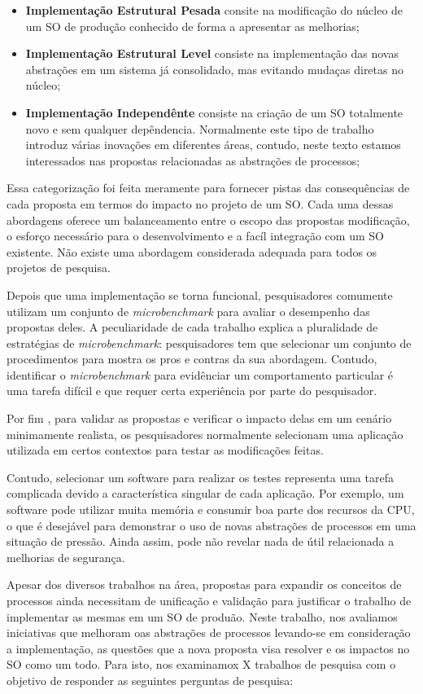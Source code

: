 \begin{itemize}
\item \textbf{Implementação Estrutural Pesada} consite na modificação do núcleo
  de um SO de produção conhecido de forma a apresentar as melhorias;
\item \textbf{Implementação Estrutural Level} consiste na implementação das
  novas abstrações em um sistema já consolidado, mas evitando mudaças diretas
  no núcleo;
\item \textbf{Implementação Independênte} consiste na criação de um SO
  totalmente novo e sem qualquer depêndencia. Normalmente este tipo de trabalho
  introduz várias inovações em diferentes áreas, contudo, neste texto estamos
  interessados nas propostas relacionadas as abstrações de processos;
\end{itemize}
Essa categorização foi feita meramente para fornecer pistas das consequências
de cada proposta em termos do impacto no projeto de um SO. Cada uma dessas
abordagens oferece um balanceamento entre o escopo das propostas modificação, o
esforço necessário para o desenvolvimento e a facíl integração com um SO
existente. Não existe uma abordagem considerada adequada para todos os projetos
de pesquisa.

Depois que uma implementação se torna funcional, pesquisadores comumente
utilizam um conjunto de \emph{microbenchmark} para avaliar o desempenho das
propostas deles. A peculiaridade de cada trabalho explica a pluralidade de
estratégias de \emph{microbenchmark}: pesquisadores tem que selecionar um
conjunto de procedimentos para mostra os pros e contras da sua abordagem.
Contudo, identificar o \emph{microbenchmark} para evidênciar um comportamento
particular é uma tarefa difícil e que requer certa experiência por parte do
pesquisador.

Por fim , para validar as propostas e verificar o impacto delas em um cenário
minimamente realista, os pesquisadores normalmente selecionam uma aplicação
utilizada em certos contextos para testar as modificações feitas.

Contudo, selecionar um software para realizar os testes representa uma tarefa
complicada devido a característica singular de cada aplicação. Por exemplo, um
software pode utilizar muita memória e consumir boa parte dos recursos da CPU,
o que é desejável para demonstrar o uso de novas abstrações de processos em uma
situação de pressão. Ainda assim, pode não revelar nada de útil relacionada a
melhorias de segurança.

Apesar dos diversos trabalhos na área, propostas para expandir os conceitos
de processos ainda necessitam de unificação e validação para justificar o
trabalho de implementar as mesmas em um SO de produão. Neste trabalho, nos
avaliamos iniciativas que melhoram oas abstrações de processos levando-se em
consideração a implementação, as questões que a nova proposta visa resolver e
os impactos no SO como um todo. Para isto, nos examinamox X trabalhos de
pesquisa com o objetivo de responder as seguintes perguntas de pesquisa:

